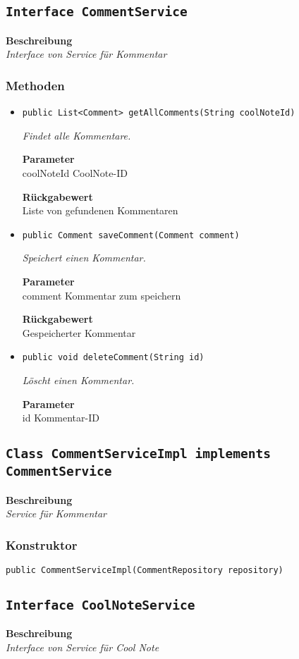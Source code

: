     \subsection{\texttt{Interface CommentService}}
    \textbf{Beschreibung} \\
    \textit{Interface von Service für Kommentar}
    \subsubsection*{Methoden}
    \begin{itemize}
    	\item{\texttt{public List<Comment> getAllComments(String coolNoteId)}}
    	
    	\textit{Findet alle Kommentare.}
    	
    	\textbf{Parameter} \\
    	coolNoteId CoolNote-ID
    	
    	\textbf{Rückgabewert} \\
    	Liste von gefundenen Kommentaren        \item{\texttt{public Comment saveComment(Comment comment)}}
    	
    	\textit{Speichert einen Kommentar.}
    	
    	\textbf{Parameter} \\
    	comment Kommentar zum speichern
    	
    	\textbf{Rückgabewert} \\
    	Gespeicherter Kommentar        \item{\texttt{public void deleteComment(String id)}}
    	
    	\textit{Löscht einen Kommentar.}
    	
    	\textbf{Parameter} \\
    	id Kommentar-ID
    	
    	
    \end{itemize}
    \subsection{\texttt{Class CommentServiceImpl implements CommentService}}
    \textbf{Beschreibung} \\
    \textit{Service für Kommentar}
    \subsubsection*{Konstruktor}
    \texttt{public CommentServiceImpl(CommentRepository repository)}
    \subsection{\texttt{Interface CoolNoteService}}
    \textbf{Beschreibung} \\
    \textit{Interface von Service für Cool Note}
